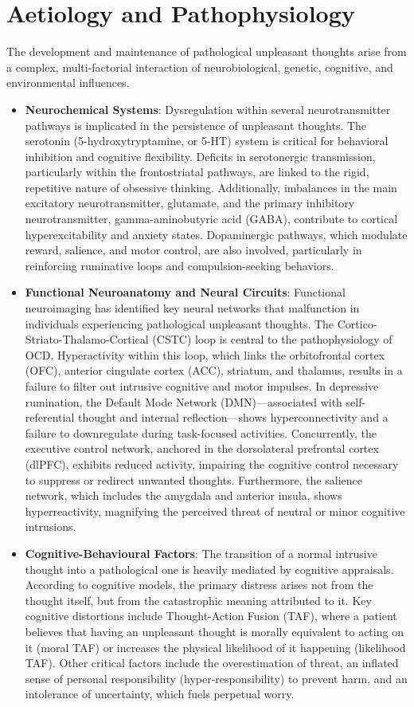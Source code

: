 \section*{Aetiology and Pathophysiology}
The development and maintenance of pathological unpleasant thoughts arise from a complex, multi-factorial interaction of neurobiological, genetic, cognitive, and environmental influences.
\begin{itemize}
  \item \textbf{Neurochemical Systems}: Dysregulation within several neurotransmitter pathways is implicated in the persistence of unpleasant thoughts. The serotonin (5-hydroxytryptamine, or 5-HT) system is critical for behavioral inhibition and cognitive flexibility. Deficits in serotonergic transmission, particularly within the frontostriatal pathways, are linked to the rigid, repetitive nature of obsessive thinking. Additionally, imbalances in the main excitatory neurotransmitter, glutamate, and the primary inhibitory neurotransmitter, gamma-aminobutyric acid (GABA), contribute to cortical hyperexcitability and anxiety states. Dopaminergic pathways, which modulate reward, salience, and motor control, are also involved, particularly in reinforcing ruminative loops and compulsion-seeking behaviors.
  \item \textbf{Functional Neuroanatomy and Neural Circuits}: Functional neuroimaging has identified key neural networks that malfunction in individuals experiencing pathological unpleasant thoughts. The Cortico-Striato-Thalamo-Cortical (CSTC) loop is central to the pathophysiology of OCD. Hyperactivity within this loop, which links the orbitofrontal cortex (OFC), anterior cingulate cortex (ACC), striatum, and thalamus, results in a failure to filter out intrusive cognitive and motor impulses. In depressive rumination, the Default Mode Network (DMN)---associated with self-referential thought and internal reflection---shows hyperconnectivity and a failure to downregulate during task-focused activities. Concurrently, the executive control network, anchored in the dorsolateral prefrontal cortex (dlPFC), exhibits reduced activity, impairing the cognitive control necessary to suppress or redirect unwanted thoughts. Furthermore, the salience network, which includes the amygdala and anterior insula, shows hyperreactivity, magnifying the perceived threat of neutral or minor cognitive intrusions.
  \item \textbf{Cognitive-Behavioural Factors}: The transition of a normal intrusive thought into a pathological one is heavily mediated by cognitive appraisals. According to cognitive models, the primary distress arises not from the thought itself, but from the catastrophic meaning attributed to it. Key cognitive distortions include Thought-Action Fusion (TAF), where a patient believes that having an unpleasant thought is morally equivalent to acting on it (moral TAF) or increases the physical likelihood of it happening (likelihood TAF). Other critical factors include the overestimation of threat, an inflated sense of personal responsibility (hyper-responsibility) to prevent harm, and an intolerance of uncertainty, which fuels perpetual worry.

\end{itemize}
